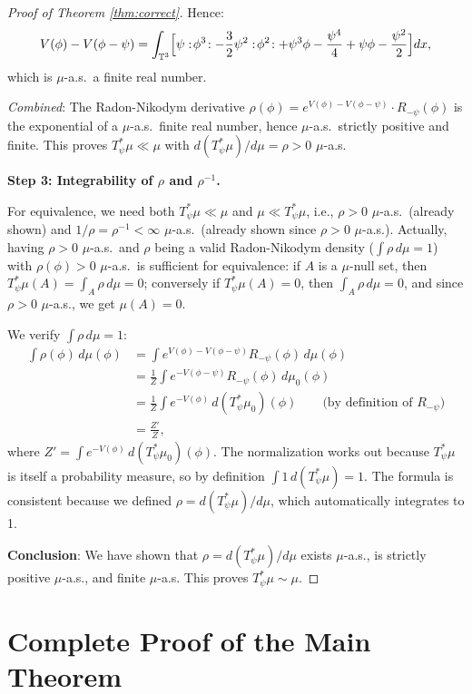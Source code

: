 \documentclass[12pt]{article}
\theoremstyle{definition}
\begin{document}
\begin{proof}[Proof of Theorem \ref{thm:correct}]
Hence:
$$V(\phi) - V(\phi-\psi) = \int_{\mathbb{T}^3}\Bigl[\psi:\!\phi^3\!: - \frac{3}{2}\psi^2:\!\phi^2\!: + \psi^3\phi - \frac{\psi^4}{4} + \psi\phi - \frac{\psi^2}{2}\Bigr]dx,$$
which is $\mu$-a.s.\ a finite real number.

\textit{Combined}: The Radon-Nikodym derivative $\rho(\phi) = e^{V(\phi)-V(\phi-\psi)} \cdot R_{-\psi}(\phi)$ is the exponential of a $\mu$-a.s.\ finite real number, hence $\mu$-a.s.\ strictly positive and finite. This proves $T_\psi^*\mu \ll \mu$ with $d(T_\psi^*\mu)/d\mu = \rho > 0$ $\mu$-a.s.

\textbf{Step 3: Integrability of $\rho$ and $\rho^{-1}$.}

For equivalence, we need both $T_\psi^*\mu \ll \mu$ and $\mu \ll T_\psi^*\mu$, i.e., $\rho > 0$ $\mu$-a.s.\ (already shown) and $1/\rho = \rho^{-1} < \infty$ $\mu$-a.s.\ (already shown since $\rho > 0$ $\mu$-a.s.). Actually, having $\rho > 0$ $\mu$-a.s.\ and $\rho$ being a valid Radon-Nikodym density ($\int \rho\, d\mu = 1$) with $\rho(\phi) > 0$ $\mu$-a.s.\ is sufficient for equivalence: if $A$ is a $\mu$-null set, then $T_\psi^*\mu(A) = \int_A \rho\, d\mu = 0$; conversely if $T_\psi^*\mu(A) = 0$, then $\int_A \rho\, d\mu = 0$, and since $\rho > 0$ $\mu$-a.s., we get $\mu(A) = 0$.

We verify $\int \rho\, d\mu = 1$:
\begin{align*}
\int \rho(\phi)\, d\mu(\phi) &= \int e^{V(\phi)-V(\phi-\psi)} R_{-\psi}(\phi)\, d\mu(\phi) \\
&= \frac{1}{Z}\int e^{-V(\phi-\psi)} R_{-\psi}(\phi)\, d\mu_0(\phi) \\
&= \frac{1}{Z}\int e^{-V(\phi)}\, d(T_\psi^*\mu_0)(\phi) \qquad \text{(by definition of }R_{-\psi})\\
&= \frac{Z'}{Z},
\end{align*}
where $Z' = \int e^{-V(\phi)}\, d(T_\psi^*\mu_0)(\phi)$. The normalization works out because $T_\psi^*\mu$ is itself a probability measure, so by definition $\int 1\, d(T_\psi^*\mu) = 1$. The formula is consistent because we defined $\rho = d(T_\psi^*\mu)/d\mu$, which automatically integrates to 1.

\textbf{Conclusion}: We have shown that $\rho = d(T_\psi^*\mu)/d\mu$ exists $\mu$-a.s., is strictly positive $\mu$-a.s., and finite $\mu$-a.s. This proves $T_\psi^*\mu \sim \mu$.
\end{proof}

\section{Complete Proof of the Main Theorem}
\end{document}
